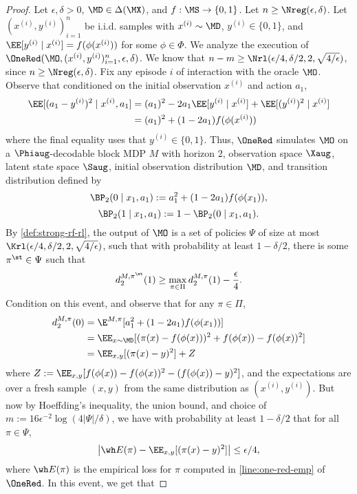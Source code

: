 \begin{proof}
Let $\epsilon,\delta>0$, $\MD \in \Delta(\MX)$, and $f: \MS \to \{0,1\}$. Let $n \geq \Nreg(\epsilon,\delta)$. Let $(x^{(i)},y^{(i)})_{i=1}^n$ be i.i.d. samples with $x^{(i)} \sim \MD$, $y^{(i)} \in \{0,1\}$, and $\EE[y^{(i)}\mid{}x^{(i)}] = f(\phi(x^{(i)}))$ for some $\phi \in \Phi$. We analyze the execution of $\OneRed(\MO,(x^{(i)},y^{(i)})_{i=1}^n, \epsilon,\delta)$. We know that $n-m \geq \Nrl(\epsilon/4,\delta/2,2,\sqrt{4/\epsilon})$, since $n \geq \Nreg(\epsilon,\delta)$. Fix any episode $i$ of interaction with the oracle $\MO$. Observe that conditioned on the initial observation $x^{(i)}$ and action $a_1$,
\begin{align*}
\EE[(a_1-y^{(i)})^2\mid{} x^{(i)}, a_1]
&= (a_1)^2 - 2 a_1 \EE[y^{(i)}\mid{} x^{(i)}] + \EE[(y^{(i)})^2 \mid{} x^{(i)}] \\ 
&= (a_1)^2 + (1 - 2a_1) f(\phi(x^{(i)}))
\end{align*}
where the final equality uses that $y^{(i)} \in \{0,1\}$. Thus, $\OneRed$ simulates $\MO$ on a $\Phiaug$-decodable block MDP $M$ with horizon $2$, observation space $\Xaug$, latent state space $\Saug$, initial observation distribution $\MD$, and transition distribution defined by
\[\BP_2(0\mid{} x_1,a_1) := a_1^2 + (1-2a_1)f(\phi(x_1)),\]
\[\BP_2(1\mid{} x_1,a_1) := 1 - \BP_2(0\mid{} x_1,a_1).\]
By \cref{def:strong-rf-rl}, the output of $\MO$ is a set of policies $\Psi$ of size at most $\Krl(\epsilon/4,\delta/2,2,\sqrt{4/\epsilon})$, such that with probability at least $1-\delta/2$, there is some $\pi^\st \in \Psi$ such that
\[d^{M,\pi^\st}_2(1) \geq \max_{\pi\in\Pi} d^{M,\pi}_2(1) - \frac{\epsilon}{4}.\]
Condition on this event, and observe that for any $\pi \in \Pi$,
\begin{align*}
d^{M,\pi}_2(0) 
&= \E^{M,\pi}[a_1^2 + (1-2a_1)f(\phi(x_1))] \\ 
&= \EE_{x \sim \MD}[(\pi(x) - f(\phi(x)))^2 + f(\phi(x)) - f(\phi(x))^2] \\ 
&= \EE_{x,y}[(\pi(x) - y)^2] + Z
\end{align*}
where $Z := \EE_{x,y}[f(\phi(x)) - f(\phi(x))^2 - (f(\phi(x))-y)^2]$, and the expectations are over a fresh sample $(x,y)$ from the same distribution as $(x^{(i)},y^{(i)})$. But now by Hoeffding's inequality, the union bound, and choice of $m := 16\epsilon^{-2}\log(4|\Psi|/\delta)$, we have with probability at least $1-\delta/2$ that for all $\pi\in\Psi$,
\[\left|\wh E(\pi) - \EE_{x,y}[(\pi(x)-y)^2]\right| \leq \epsilon/4,\]
where $\wh E(\pi)$ is the empirical loss for $\pi$ computed in \cref{line:one-red-emp} of $\OneRed$. In this event, we get that 

\end{proof}

